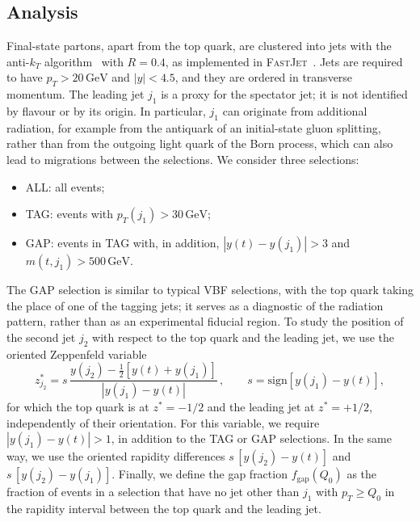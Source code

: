 \documentclass[a4paper,11pt]{article}
\newcommand{\GeV}{\ensuremath{\,\text{GeV}}}
\newcommand{\pT}{p_T}
\begin{document}
\subsection{Analysis}
\label{sec:analysis}

Final-state partons, apart from the top quark, are clustered into jets
with the anti-$k_T$ algorithm~\cite{Cacciari:2008gp} with $R=0.4$, as
implemented in \textsc{FastJet}~\cite{Cacciari:2011ma}. Jets are
required to have $\pT>20\GeV$ and $|y|<4.5$, and they are ordered in
transverse momentum. The leading jet $j_1$ is a proxy for the
spectator jet; it is not identified by flavour or by its origin. In
particular, $j_1$ can originate from additional radiation, for example
from the antiquark of an initial-state gluon splitting, rather than from
the outgoing light quark of the Born process, which can also lead to
migrations between the selections. We consider three selections:
\begin{itemize}
\item ALL: all events;
\item TAG: events with $\pT(j_1)>30\GeV$;
\item GAP: events in TAG with, in addition, $|y(t)-y(j_1)|>3$ and
  $m(t,j_1)>500\GeV$.
\end{itemize}
The GAP selection is similar to typical VBF selections, with the top
quark taking the place of one of the tagging jets; it serves as a
diagnostic of the radiation pattern, rather than as an experimental
fiducial region. To study the
position of the second jet $j_2$ with respect to the top quark and the
leading jet, we use the oriented Zeppenfeld variable
\begin{equation}
  z^*_{j_2}=s\,\frac{y(j_2)-\frac{1}{2}\left[y(t)+y(j_1)\right]}{|y(j_1)-y(t)|}\,,
  \qquad s=\mathrm{sign}\left[y(j_1)-y(t)\right],
  \label{eq:zstar}
\end{equation}
for which the top quark is at $z^*=-1/2$ and the leading jet at
$z^*=+1/2$, independently of their orientation. For this variable, we
require $|y(j_1)-y(t)|>1$, in addition to the TAG or GAP selections.
In the same way, we use the oriented rapidity differences
$s\,[y(j_2)-y(t)]$ and $s\,[y(j_2)-y(j_1)]$. Finally, we define the
gap fraction $f_{\mathrm{gap}}(Q_0)$ as the fraction of events in a
selection that have no jet other than $j_1$ with $\pT\ge Q_0$ in the
rapidity interval between the top quark and the leading jet.
\end{document}
